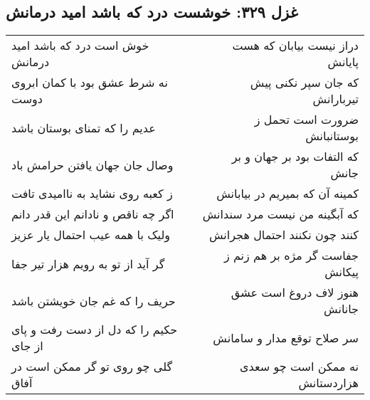 \begin{center}
\section*{غزل ۳۲۹: خوشست درد که باشد امید درمانش}
\label{sec:329}
\begin{longtable}{l p{0.5cm} r}
خوش است درد که باشد امید درمانش
&&
دراز نیست بیابان که هست پایانش
\\
نه شرط عشق بود با کمان ابروی دوست
&&
که جان سپر نکنی پیش تیربارانش
\\
عدیم را که تمنای بوستان باشد
&&
ضرورت است تحمل ز بوستانبانش
\\
وصال جان جهان یافتن حرامش باد
&&
که التفات بود بر جهان و بر جانش
\\
ز کعبه روی نشاید به ناامیدی تافت
&&
کمینه آن که بمیریم در بیابانش
\\
اگر چه ناقص و نادانم این قدر دانم
&&
که آبگینه من نیست مرد سندانش
\\
ولیک با همه عیب احتمال یار عزیز
&&
کنند چون نکنند احتمال هجرانش
\\
گر آید از تو به رویم هزار تیر جفا
&&
جفاست گر مژه بر هم زنم ز پیکانش
\\
حریف را که غم جان خویشتن باشد
&&
هنوز لاف دروغ است عشق جانانش
\\
حکیم را که دل از دست رفت و پای از جای
&&
سر صلاح توقع مدار و سامانش
\\
گلی چو روی تو گر ممکن است در آفاق
&&
نه ممکن است چو سعدی هزاردستانش
\\
\end{longtable}
\end{center}
